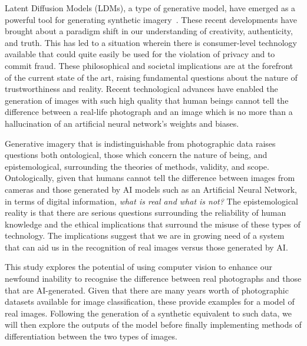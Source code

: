 \documentclass{article}
\begin{document}
Latent Diffusion Models (LDMs), a type of generative model, have emerged as a powerful tool for generating synthetic imagery~\cite{rombach2022high}. These recent developments have brought about a paradigm shift in our understanding of creativity, authenticity, and truth. This has led to a situation wherein there is consumer-level technology available that could quite easily be used for the violation of privacy and to commit fraud. These philosophical and societal implications are at the forefront of the current state of the art, raising fundamental questions about the nature of trustworthiness and reality. Recent technological advances have enabled the generation of images with such high quality that human beings cannot tell the difference between a real-life photograph and an image which is no more than a hallucination of an artificial neural network's weights and biases. 

Generative imagery that is indistinguishable from photographic data raises questions both ontological, those which concern the nature of being, and epistemological, surrounding the theories of methods, validity, and scope. Ontologically, given that humans cannot tell the difference between images from cameras and those generated by AI models such as an Artificial Neural Network, in terms of digital information, \textit{what is real and what is not?} The epistemological reality is that there are serious questions surrounding the reliability of human knowledge and the ethical implications that surround the misuse of these types of technology. The implications suggest that we are in growing need of a system that can aid us in the recognition of real images versus those generated by AI. 

This study explores the potential of using computer vision to enhance our newfound inability to recognise the difference between real photographs and those that are AI-generated. Given that there are many years worth of photographic datasets available for image classification, these provide examples for a model of real images. Following the generation of a synthetic equivalent to such data, we will then explore the outputs of the model before finally implementing methods of differentiation between the two types of images. 
\end{document}
